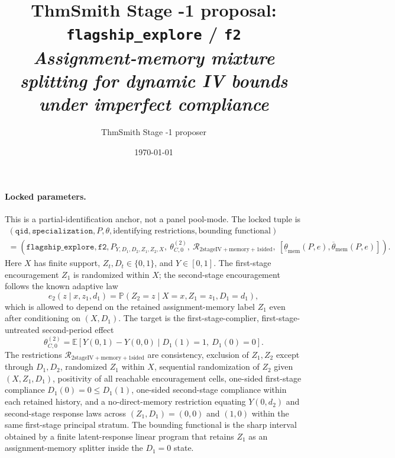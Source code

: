 \documentclass[11pt]{article}
\title{ThmSmith Stage -1 proposal: \texttt{flagship\_explore} / \texttt{f2}%
  \\ \large\textit{Assignment-memory mixture splitting for dynamic IV bounds under imperfect compliance}}
\author{ThmSmith Stage -1 proposer}
\date{\today}
\newcommand{\E}{\mathbb{E}}
\renewcommand{\Pr}{\mathbb{P}}
\theoremstyle{definition}
\theoremstyle{plain}
\theoremstyle{remark}
\begin{document}
\maketitle


\paragraph{Locked parameters.}
This is a partial-identification anchor, not a panel pool-mode.  The locked tuple is
\[
\begin{gathered}
(\texttt{qid},\texttt{specialization},P,\theta,\text{identifying restrictions},
  \text{bounding functional})\\
=
(\texttt{flagship\_explore},\texttt{f2},
  P_{Y,D_1,D_2,Z_1,Z_2,X},\ \theta_{C,0}^{(2)},\
  \mathcal{R}_{\mathrm{2stageIV+memory+1sided}},\
  [\underline\theta_{\mathrm{mem}}(P,e),\overline\theta_{\mathrm{mem}}(P,e)]) .
\end{gathered}
\]
Here \(X\) has finite support, \(Z_t,D_t\in\{0,1\}\), and \(Y\in[0,1]\).  The first-stage encouragement \(Z_1\) is randomized within \(X\); the second-stage encouragement follows the known adaptive law
\[
e_2(z\mid x,z_1,d_1)=\Pr(Z_2=z\mid X=x,Z_1=z_1,D_1=d_1),
\]
which is allowed to depend on the retained assignment-memory label \(Z_1\) even after conditioning on \((X,D_1)\).  The target is the first-stage-complier, first-stage-untreated second-period effect
\[
\theta_{C,0}^{(2)}
=\E\!\left[Y(0,1)-Y(0,0)\mid D_1(1)=1,\ D_1(0)=0\right].
\]
The restrictions \(\mathcal{R}_{\mathrm{2stageIV+memory+1sided}}\) are consistency, exclusion of \(Z_1,Z_2\) except through \(D_1,D_2\), randomized \(Z_1\) within \(X\), sequential randomization of \(Z_2\) given \((X,Z_1,D_1)\), positivity of all reachable encouragement cells, one-sided first-stage compliance \(D_1(0)=0\le D_1(1)\), one-sided second-stage compliance within each retained history, and a no-direct-memory restriction equating \(Y(0,d_2)\) and second-stage response laws across \((Z_1,D_1)=(0,0)\) and \((1,0)\) within the same first-stage principal stratum.  The bounding functional is the sharp interval obtained by a finite latent-response linear program that retains \(Z_1\) as an assignment-memory splitter inside the \(D_1=0\) state.
\end{document}
